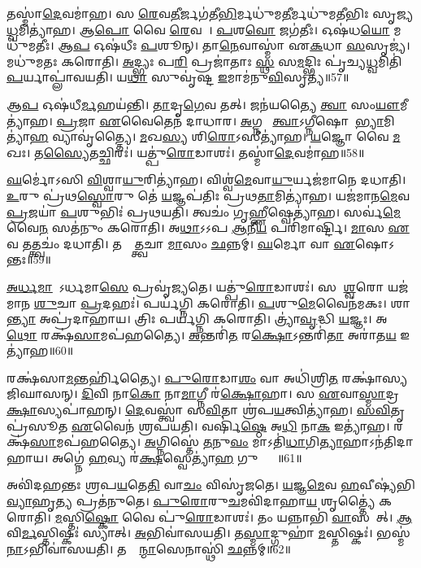 𑌤𑌸𑍍𑌮𑌾॑\ul{𑌦𑍇}𑌵𑌮𑌾॑𑌹।
𑌸 \ul{𑌰𑍇}𑌵\ul{𑌤𑍀}𑌰𑍍𑌜𑌗॑𑌤𑍀\ul{𑌭𑌿}𑌰𑍍𑌮𑌧𑍁॑𑌮\ul{𑌤𑍀}𑌰𑍍𑌮𑌧𑍁॑𑌮𑌤𑍀𑌭𑌿𑌃 𑌸𑍃𑌜𑍍𑌯\ul{𑌧𑍍𑌵}𑌮𑌿𑌤𑍍𑌯𑌾॑𑌹।
𑌆\ul{𑌪𑍋} 𑌵𑍈 \ul{𑌰𑍇}𑌵𑌤𑍀𑌃᳚।
\ul{𑌪}𑌶\ul{𑌵𑍋} 𑌜𑌗॑𑌤𑍀𑌃।
𑌓𑌷॑𑌧\ul{𑌯𑍋} 𑌮𑌧𑍁॑𑌮𑌤𑍀𑌃।
𑌆\ul{𑌪} 𑌓𑌷॑𑌧𑍀𑌃 \ul{𑌪}𑌶𑍂𑌨𑍍।
𑌤𑌾\ul{𑌨𑍇}𑌵𑌾𑌸𑍍𑌮𑌾॑ 𑌏\ul{𑌕}𑌧𑌾 \ul{𑌸}\ul{}𑌸𑍃𑌜𑍍𑌯॑।
𑌮𑌧𑍁॑𑌮𑌤𑌃 𑌕𑌰𑍋𑌤𑌿।
\ul{𑌅}𑌦𑍍𑌭𑍍𑌯𑌃 𑌪\ul{𑌰𑌿} 𑌪𑍍𑌰𑌜𑌾॑𑌤𑌾𑌃 \ul{𑌸𑍍𑌥} 𑌸\ul{𑌮}𑌦𑍍𑌭𑌿𑌃 𑌪𑍃॑𑌚𑍍𑌯\ul{𑌧𑍍𑌵}𑌮𑌿𑌤𑌿॑ \ul{𑌪}𑌰𑍍𑌯𑌾𑌪𑍍𑌲𑌾॑𑌵𑌯𑌤𑌿।
𑌯\ul{𑌥𑌾} 𑌸𑍁𑌵𑍃॑𑌷𑍍𑌟 \ul{𑌇}𑌮𑌾𑌮॑𑌨𑍁\ul{𑌵𑌿}𑌸𑍃𑌤𑍍𑌯॑॥57॥

𑌆\ul{𑌪} 𑌓𑌷॑𑌧𑍀\ul{𑌰𑍍𑌮}𑌹𑌯॑𑌨𑍍𑌤𑌿।
\ul{𑌤𑌾}𑌦𑍃\ul{𑌗𑍇}𑌵 𑌤𑌤𑍍।
𑌜𑌨॑𑌯𑌤𑍍𑌯𑍈 \ul{𑌤𑍍𑌵𑌾} 𑌸𑌂\ul{𑌯𑍗}𑌮𑍀𑌤𑍍𑌯𑌾॑𑌹।
\ul{𑌪𑍍𑌰}𑌜𑌾 \ul{𑌏}𑌵𑍈𑌤𑍇𑌨॑ 𑌦𑌾𑌧𑌾𑌰।
\ul{𑌅}𑌗𑍍𑌨𑌯𑍇᳚ \ul{𑌤𑍍𑌵𑌾}\-𑌽𑌗𑍍𑌨𑍀𑌷𑍋𑌮𑌾᳚\ul{𑌭𑍍𑌯𑌾}𑌮𑌿𑌤𑍍𑌯𑌾॑\ul{𑌹} 𑌵𑍍𑌯𑌾𑌵𑍃॑𑌤𑍍𑌤𑍍𑌯𑍈।
\ul{𑌮}𑌖\ul{𑌸𑍍𑌯} 𑌶𑌿\ul{𑌰𑍋}\-𑌽𑌸𑍀𑌤𑍍𑌯𑌾॑𑌹।
\ul{𑌯}𑌜𑍍𑌞𑍋 𑌵𑍈 \ul{𑌮}𑌖𑌃।
𑌤\ul{𑌸𑍍𑌯𑍈}𑌤𑌚𑍍𑌛𑌿𑌰𑌃॑।
𑌯𑌤𑍍𑌪𑍁॑\ul{𑌰𑍋}𑌡𑌾𑌶𑌃॑।
𑌤𑌸𑍍𑌮𑌾॑\ul{𑌦𑍇}𑌵𑌮𑌾॑𑌹॥58॥

\ul{𑌘}𑌰𑍍𑌮𑍋॑𑌽𑌸𑌿 \ul{𑌵𑌿}𑌶𑍍𑌵𑌾\ul{𑌯𑍁}𑌰𑌿𑌤𑍍𑌯𑌾॑𑌹।
𑌵𑌿𑌶𑍍𑌵॑\ul{𑌮𑍇}𑌵𑌾\ul{𑌯𑍁}𑌰𑍍𑌯𑌜॑𑌮𑌾𑌨𑍇 𑌦𑌧𑌾𑌤𑌿।
\ul{𑌉}𑌰𑍁 𑌪𑍍𑌰॑𑌥\ul{𑌸𑍍𑌵𑍋}𑌰𑍁 𑌤𑍇॑ \ul{𑌯}𑌜𑍍𑌞𑌪॑𑌤𑌿𑌃 𑌪𑍍𑌰𑌥\ul{𑌤𑌾}𑌮𑌿𑌤𑍍𑌯𑌾॑𑌹।
𑌯𑌜॑𑌮𑌾𑌨\ul{𑌮𑍇}𑌵 \ul{𑌪𑍍𑌰}𑌜𑌯𑌾॑ \ul{𑌪}𑌶𑍁𑌭𑌿𑌃॑ 𑌪𑍍𑌰𑌥𑌯𑌤𑌿।
𑌤𑍍𑌵𑌚𑌂॑ 𑌗𑍃\ul{𑌹𑍍𑌣𑍀}𑌷𑍍𑌵𑍇𑌤𑍍𑌯𑌾॑𑌹।
𑌸𑌰𑍍𑌵॑\ul{𑌮𑍇}𑌵𑍈\ul{𑌨}\ul{} 𑌸𑌤॑𑌨𑍁𑌂 𑌕𑌰𑍋𑌤𑌿।
𑌅\ul{𑌥𑌾}𑌽𑌽𑌪 \ul{𑌆}𑌨𑍀\ul{𑌯} 𑌪𑌰𑌿॑𑌮𑌾𑌰𑍍𑌷𑍍𑌟𑌿।
\ul{𑌮𑌾}\ul{}𑌸 \ul{𑌏}𑌵 𑌤𑌤𑍍𑌤𑍍𑌵𑌚𑌂॑ 𑌦𑌧𑌾𑌤𑌿।
𑌤𑌸𑍍𑌮𑌾᳚\ul{𑌤𑍍𑌤𑍍𑌵}𑌚𑌾 \ul{𑌮𑌾}\ul{}𑌸𑌂 \ul{𑌛}𑌨𑍍𑌨𑌮𑍍।
\ul{𑌘}𑌰𑍍𑌮𑍋 𑌵𑌾 \ul{𑌏}𑌷𑍋\-𑌽𑌶𑌾᳚𑌨𑍍𑌤𑌃॥59॥

\ul{𑌅}\ul{𑌰𑍍𑌧}\ul{𑌮𑌾}𑌸𑍇᳚\-𑌽𑌰𑍍𑌧𑌮𑌾\ul{𑌸𑍇} 𑌪𑍍𑌰𑌵𑍃॑𑌜𑍍𑌯𑌤𑍇।
𑌯𑌤𑍍𑌪𑍁॑\ul{𑌰𑍋}𑌡𑌾𑌶𑌃॑।
𑌸 𑌈᳚\ul{𑌶𑍍𑌵}𑌰𑍋 𑌯𑌜॑𑌮𑌾𑌨 \ul{𑌶𑍁}𑌚𑌾 \ul{𑌪𑍍𑌰}𑌦𑌹𑌃॑।
𑌪𑌰𑍍𑌯॑𑌗𑍍𑌨𑌿 𑌕𑌰𑍋𑌤𑌿।
\ul{𑌪}𑌶𑍁\ul{𑌮𑍇}𑌵𑍈𑌨॑𑌮𑌕𑌃।
𑌶𑌾\ul{𑌨𑍍𑌤𑍍𑌯𑌾} 𑌅𑌪𑍍𑌰॑𑌦𑌾𑌹𑌾𑌯।
𑌤𑍍𑌰𑌿𑌃 𑌪𑌰𑍍𑌯॑𑌗𑍍𑌨𑌿 𑌕𑌰𑍋𑌤𑌿।
𑌤𑍍𑌰𑍍𑌯𑌾॑\ul{𑌵𑍃}𑌦𑍍𑌧𑌿 \ul{𑌯}𑌜𑍍𑌞𑌃।
𑌅\ul{𑌥𑍋} 𑌰𑌕𑍍𑌷॑\ul{𑌸𑌾}𑌮𑌪॑𑌹𑌤𑍍𑌯𑍈।
\ul{𑌅}𑌨𑍍𑌤𑌰𑌿॑\ul{𑌤}\ul{} 𑌰\ul{𑌕𑍍𑌷𑍋}\-𑌽𑌨𑍍𑌤𑌰𑌿॑\ul{𑌤𑌾} 𑌅𑌰𑌾॑𑌤\ul{𑌯} 𑌇𑌤𑍍𑌯𑌾॑𑌹॥60॥

𑌰𑌕𑍍𑌷॑𑌸𑌾\ul{𑌮}𑌨𑍍𑌤𑌰𑍍\mbox{}𑌹𑌿॑𑌤𑍍𑌯𑍈।
\ul{𑌪𑍁}\ul{𑌰𑍋}𑌡𑌾\ul{𑌶𑌂} 𑌵𑌾 𑌅𑌧𑌿॑𑌶𑍍𑌰𑌿\ul{𑌤}\ul{} 𑌰𑌕𑍍𑌷𑌾॑𑌸𑍍𑌯\-𑌜𑌿𑌘𑌾𑌸𑌨𑍍।
\ul{𑌦𑌿}𑌵𑌿 𑌨𑌾\ul{𑌕𑍋} 𑌨𑌾\ul{𑌮𑌾}𑌗𑍍𑌨𑍀 𑌰॑\ul{𑌕𑍍𑌷𑍋}𑌹𑌾।
𑌸 \ul{𑌏}𑌵𑌾\ul{𑌸𑍍𑌮𑌾}𑌦𑍍𑌰\ul{𑌕𑍍𑌷𑌾}\ul{}𑌸𑍍𑌯𑌪𑌾॑𑌹𑌨𑍍।
\ul{𑌦𑍇}𑌵𑌸𑍍𑌤𑍍𑌵𑌾॑ 𑌸\ul{𑌵𑌿}𑌤𑌾 𑌶𑍍𑌰॑𑌪\ul{𑌯}𑌤𑍍𑌵𑌿𑌤𑍍𑌯𑌾॑𑌹।
\ul{𑌸}\ul{𑌵𑌿}𑌤𑍃𑌪𑍍𑌰॑𑌸𑍂𑌤 \ul{𑌏}𑌵𑍈𑌨॑ 𑌶𑍍𑌰𑌪𑌯𑌤𑌿।
𑌵𑌰𑍍\mbox{}𑌷𑌿॑\ul{𑌷𑍍𑌠𑍇} 𑌅\ul{𑌧𑌿} 𑌨𑌾\ul{𑌕} 𑌇𑌤𑍍𑌯𑌾॑𑌹।
𑌰𑌕𑍍𑌷॑\ul{𑌸𑌾}𑌮𑌪॑𑌹𑌤𑍍𑌯𑍈।
\ul{𑌅}𑌗𑍍𑌨𑌿𑌸𑍍𑌤𑍇॑ \ul{𑌤}𑌨𑍁\ul{𑌵𑌂} 𑌮𑌾𑌽𑌤𑌿॑\ul{𑌧𑌾}𑌗𑌿\ul{𑌤𑍍𑌯𑌾}𑌹𑌾\-𑌽𑌨॑𑌤𑌿𑌦𑌾𑌹𑌾𑌯।
𑌅𑌗𑍍𑌨𑍇॑ \ul{𑌹}𑌵𑍍𑌯 𑌰॑\ul{𑌕𑍍𑌷}𑌸𑍍𑌵𑍇𑌤𑍍𑌯𑌾॑\ul{𑌹} 𑌗𑍁𑌪𑍍𑌤𑍍𑌯𑍈᳚॥61॥

𑌅𑌵𑌿॑𑌦𑌹𑌨𑍍𑌤𑌃 𑌶𑍍𑌰𑌪\ul{𑌯}𑌤𑍇\ul{𑌤𑌿} 𑌵𑌾\ul{𑌚𑌂} 𑌵𑌿𑌸𑍃॑𑌜𑌤𑍇।
\ul{𑌯}𑌜𑍍𑌞\ul{𑌮𑍇}𑌵 \ul{𑌹}𑌵𑍀𑌷𑍍𑌯॑𑌭𑌿\ul{𑌵𑍍𑌯𑌾}𑌹𑍃\ul{𑌤𑍍𑌯} 𑌪𑍍𑌰𑌤॑𑌨𑍁𑌤𑍇।
\ul{𑌪𑍁}\ul{𑌰𑍋}𑌰𑍁\ul{𑌚}𑌮𑌵𑌿॑𑌦𑌾𑌹𑌾\ul{𑌯} 𑌶𑍃𑌤𑍍𑌤𑍍𑌯𑍈॑ 𑌕𑌰𑍋𑌤𑌿।
\ul{𑌮}𑌸𑍍𑌤𑌿\ul{𑌷𑍍𑌕𑍋} 𑌵𑍈 𑌪𑍁॑\ul{𑌰𑍋}𑌡𑌾𑌶𑌃॑।
𑌤𑌂 𑌯𑌨𑍍𑌨𑌾𑌭𑌿॑ \ul{𑌵𑌾}𑌸𑌯𑍇᳚𑌤𑍍।
\ul{𑌆}𑌵𑌿\ul{𑌰𑍍𑌮}𑌸𑍍𑌤𑌿𑌷𑍍𑌕𑌃॑ 𑌸𑍍𑌯𑌾𑌤𑍍।
\ul{𑌅}𑌭𑌿𑌵𑌾॑𑌸𑌯𑌤𑌿।
𑌤\ul{𑌸𑍍𑌮𑌾}𑌦𑍍𑌗𑍁𑌹𑌾॑ \ul{𑌮}𑌸𑍍𑌤𑌿𑌷𑍍𑌕𑌃॑।
𑌭𑌸𑍍𑌮॑\ul{𑌨𑌾}\-𑌽𑌭𑌿𑌵𑌾॑𑌸𑌯𑌤𑌿।
𑌤𑌸𑍍𑌮𑌾᳚\ul{𑌨𑍍𑌮𑌾}\ul{}𑌸𑍇𑌨𑌾𑌸𑍍𑌥𑌿॑ \ul{𑌛}𑌨𑍍𑌨𑌮𑍍॥62॥


